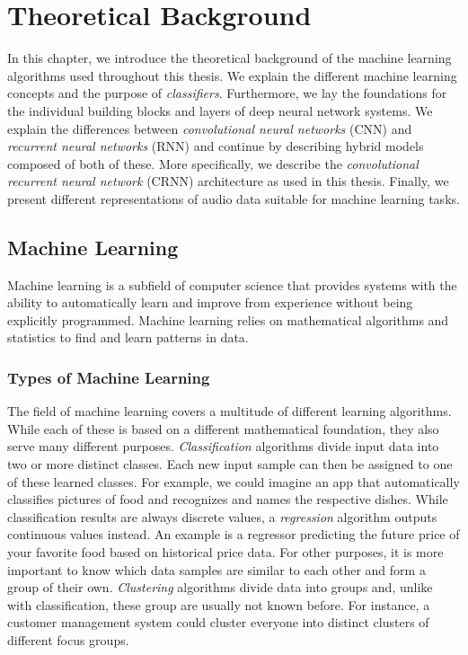 \section{Theoretical Background}
\label{sec:theoretical_background}
In this chapter, we introduce the theoretical background of the machine learning algorithms used throughout this thesis. We explain the different machine learning concepts and the purpose of \emph{classifiers}. Furthermore, we lay the foundations for the individual building blocks and layers of deep neural network systems. We explain the differences between \emph{convolutional neural networks} (CNN) and \emph{recurrent neural networks} (RNN) and continue by describing hybrid models composed of both of these. More specifically, we describe the \emph{convolutional recurrent neural network} (CRNN) architecture as used in this thesis. Finally, we present different representations of audio data suitable for machine learning tasks.

\subsection{Machine Learning}
Machine learning is a subfield of computer science that provides systems with the ability to automatically learn and improve from experience without being explicitly programmed. Machine learning relies on mathematical algorithms and statistics to find and learn patterns in data. 

\subsubsection{Types of Machine Learning}
The field of machine learning covers a multitude of different learning algorithms. While each of these is based on a different mathematical foundation, they also serve many different purposes. \emph{Classification} algorithms divide input data into two or more distinct classes. Each new input sample can then be assigned to one of these learned classes. For example, we could imagine an app that automatically classifies pictures of food and recognizes and names the respective dishes. While classification results are always discrete values, a \emph{regression} algorithm outputs continuous values instead. An example is a regressor predicting the future price of your favorite food based on historical price data. For other purposes, it is more important to know which data samples are similar to each other and form a group of their own. \emph{Clustering} algorithms divide data into groups and, unlike with classification, these group are usually not known before. For instance, a customer management system could cluster everyone into distinct clusters of different focus groups.

